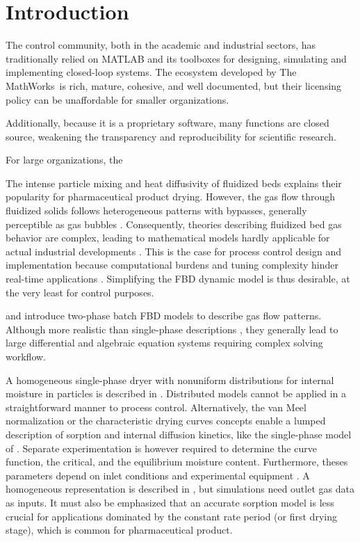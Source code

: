 \section{Introduction}

The control community, both in the academic and industrial sectors, has traditionally relied on MATLAB and its toolboxes for designing, simulating and implementing closed-loop systems. The ecosystem developed by The MathWorks\texttrademark\ is rich, mature, cohesive, and well documented, but their licensing policy can be unaffordable for smaller organizations.

Additionally, because it is a proprietary software, many functions are closed source, weakening the transparency and reproducibility for scientific research. \citep{matlabPythonJulia}

\citep{controlsystems_jl} \cite{jump_jl}


For large organizations, the  


The intense particle mixing and heat diffusivity of fluidized beds explains their popularity for pharmaceutical product drying. However, the gas flow through fluidized solids follows heterogeneous patterns with bypasses, generally perceptible as gas bubbles \citep{handbookFluidization}. Consequently, theories describing fluidized bed gas behavior are complex, leading to mathematical models hardly applicable for actual industrial developments \citep{reviewModelPhilippsen}. This is the case for process control design and implementation because computational burdens and tuning complexity hinder real-time applications \citep[e.g.][]{nmpcFBD}. Simplifying the \gls{FBD} dynamic model is thus desirable, at the very least for control purposes.

\citet{batchTsotas} and \citet{fbd2phFG} introduce two-phase batch \gls{FBD} models to describe gas flow patterns. Although more realistic than single-phase descriptions \citep{flowModelCompFB}, they generally lead to large differential and algebraic equation systems requiring complex solving workflow. 

A homogeneous single-phase dryer with nonuniform distributions for internal moisture in particles is described in \citet{batchCorn}. Distributed models cannot be applied in a straightforward manner to process control. Alternatively, the van Meel normalization \citep{vanMeelModel} or the characteristic drying curves concepts \citep{handbookDrying} enable a lumped description of sorption and internal diffusion kinetics, like the single-phase model of \citet{batchGavi}. Separate experimentation is however required to determine the curve function, the critical, and the equilibrium moisture content. Furthermore, theses parameters depend on inlet conditions and experimental equipment \citep{handbookDrying}. A homogeneous representation is described in \citet{batchThermo}, but simulations need outlet gas data as inputs. It must also be emphasized that an accurate sorption model is less crucial for applications dominated by the constant rate period (or first drying stage), which is common for pharmaceutical product. 

